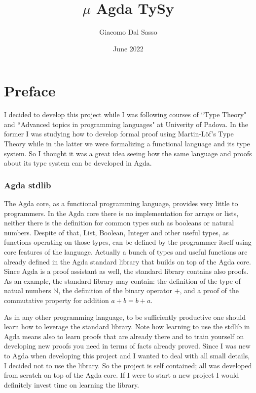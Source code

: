 \documentclass{article}
\title{$\mu$ Agda TySy}
\author{Giacomo Dal Sasso}
\date{June 2022}
\begin{document}
\newtheorem*{wek}{Weakening}
\newtheorem*{sub}{Substitution}
\newtheorem*{str}{Strengthening}
\newtheorem{stat}{}[section]

\maketitle


\section{Preface}

I decided to develop this project while I was following courses of ``Type Theory" and ``Advanced topics in programming languages" at Univerity of Padova.
In the former I was studying how to develop formal proof using Martin-Löf's Type Theory while in the latter we were formalizing a functional language and its type system.
So I thought it was a great idea seeing how the same language and proofs about its type system can be developed in Agda.


\subsubsection*{Agda stdlib}
The Agda core, as a functional programming language, provides very little to programmers.
In the Agda core there is no implementation for arrays or lists, neither there is the definition for common types such as booleans or natural numbers.
Despite of that, List, Boolean, Integer and other useful types, as functions operating on those types, can be defined by the programmer itself using core features of the language.
Actually a bunch of types and useful functions are already defined in the Agda standard library that builds on top of the Agda core.
Since Agda is a proof assistant as well, the standard library contains also proofs.
As an example, the standard library may contain: the definition of the type of natual numbers $\mathbb{N}$, the definition of the binary operator $+$, and a proof of the commutative property for addition $a + b = b + a$.

As in any other programming language, to be sufficiently productive one should learn how to leverage the standard library.
Note how learning to use the stdlib in Agda means also to learn proofs that are already there and to train yourself on developing new proofs you need in terms of facts already proved.
Since I was new to Agda when developing this project and I wanted to deal with all small details, I decided not to use the library.
So the project is self contained; all was developed from scratch on top of the Agda core.
If I were to start a new project I would definitely invest time on learning the library.
\end{document}
